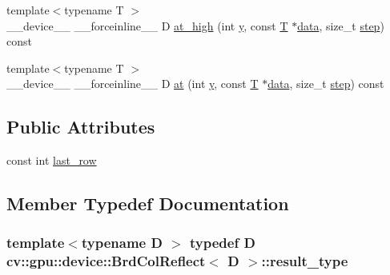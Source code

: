 \begin{DoxyCompactItemize}
{\footnotesize template$<$typename T $>$ }\\\-\_\-\-\_\-device\-\_\-\-\_\- \-\_\-\-\_\-forceinline\-\_\-\-\_\- D \hyperlink{structcv_1_1gpu_1_1device_1_1BrdColReflect_ab33ff47ec98f7e60dcde188fe440e880}{at\-\_\-high} (int \hyperlink{highgui__c_8h_af1202c02b14870c18fb3a1da73e9e7c7}{y}, const \hyperlink{calib3d_8hpp_a3efb9551a871ddd0463079a808916717}{T} $\ast$\hyperlink{legacy_8hpp_ab9fe6c09e6d02865a953fffc12fe6ca0}{data}, size\-\_\-t \hyperlink{legacy_8hpp_abc16e65f240ed0c8f3e876e8732c0a33}{step}) const 
\item 
{\footnotesize template$<$typename T $>$ }\\\-\_\-\-\_\-device\-\_\-\-\_\- \-\_\-\-\_\-forceinline\-\_\-\-\_\- D \hyperlink{structcv_1_1gpu_1_1device_1_1BrdColReflect_a2d7a904e2683e10e52a7c783213a164f}{at} (int \hyperlink{highgui__c_8h_af1202c02b14870c18fb3a1da73e9e7c7}{y}, const \hyperlink{calib3d_8hpp_a3efb9551a871ddd0463079a808916717}{T} $\ast$\hyperlink{legacy_8hpp_ab9fe6c09e6d02865a953fffc12fe6ca0}{data}, size\-\_\-t \hyperlink{legacy_8hpp_abc16e65f240ed0c8f3e876e8732c0a33}{step}) const 
\end{DoxyCompactItemize}
\subsection*{Public Attributes}
\begin{DoxyCompactItemize}
\item 
const int \hyperlink{structcv_1_1gpu_1_1device_1_1BrdColReflect_a0a449c0dd186ae97a96ada5e31e7f335}{last\-\_\-row}
\end{DoxyCompactItemize}


\subsection{Member Typedef Documentation}
\hypertarget{structcv_1_1gpu_1_1device_1_1BrdColReflect_af00d6bbdebcae365b6c9020375b99fe5}{
\subsubsection[{result\-\_\-type}]{\setlength{\rightskip}{0pt plus 5cm}template$<$typename D $>$ typedef D {\bf cv\-::gpu\-::device\-::\-Brd\-Col\-Reflect}$<$ D $>$\-::{\bf result\-\_\-type}}}\label{structcv_1_1gpu_1_1device_1_1BrdColReflect_af00d6bbdebcae365b6c9020375b99fe5}


